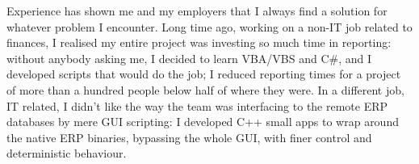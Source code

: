 
Experience has shown me and my employers that I always find a solution for whatever problem I encounter. Long time ago, working on a non-IT job related to finances, I realised my entire project was investing so much time in reporting: without anybody asking me, I decided to learn VBA/VBS and C\#, and I developed scripts that would do the job; I reduced reporting times for a project of more than a hundred people below half of where they were. In a different job, IT related, I didn't like the way the team was interfacing to the remote ERP databases by mere GUI scripting: I developed C++ small apps to wrap around the native ERP binaries, bypassing the whole GUI, with finer control and deterministic behaviour.
